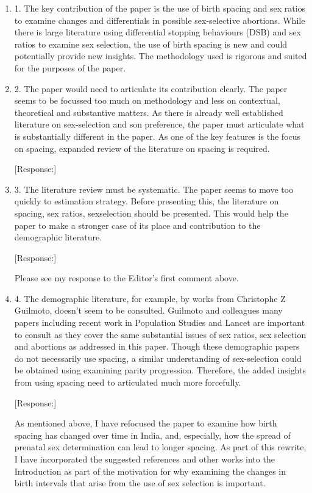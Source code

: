 \documentclass[letterpaper,12pt]{article}
\begin{document}
\begin{enumerate}
\item 1. The key contribution of the paper is the use of birth spacing and sex
ratios to examine changes and differentials in possible sex-selective
abortions. While there is large literature using differential stopping
behaviours (DSB) and sex ratios to examine sex selection, the use of
birth spacing is new and could potentially provide new insights. The
methodology used is rigorous and suited for the purposes of the paper.

\item 2. The paper would need to articulate its contribution clearly. The
paper seems to be focussed too much on methodology and less on
contextual, theoretical and substantive matters. As there is already
well established literature on sex-selection and son preference, the
paper must articulate what is substantially different in the paper. As
one of the key features is the focus on spacing, expanded review of the
literature on spacing is required.

[Response:]


\item 3. The literature review must be systematic. The paper seems to move too
quickly to estimation strategy. Before presenting this, the literature
on spacing, sex ratios, sexselection should be presented. This would
help the paper to make a stronger case of its place and contribution to
the demographic literature.

[Response:]

Please see my response to the Editor's first comment above.


\item 4. The demographic literature, for example, by works from Christophe Z
Guilmoto, doesn’t seem to be consulted. Guilmoto and colleagues many
papers including recent work in Population Studies and Lancet are
important to consult as they cover the same substantial issues of sex
ratios, sex selection and abortions as addressed in this paper. Though
these demographic papers do not necessarily use spacing, a similar
understanding of sex-selection could be obtained using examining parity
progression. Therefore, the added insights from using spacing need to
articulated much more forcefully.

[Response:]

As mentioned above, I have refocused the paper to examine how birth spacing has changed
over time in India, and, especially, how the spread of prenatal sex determination can
lead to longer spacing.
As part of this rewrite, I have incorporated the suggested references and other works into 
the Introduction as part of the motivation for why examining the changes in birth 
intervals that arise from the use of sex selection is important.


\end{enumerate}
\end{document}
